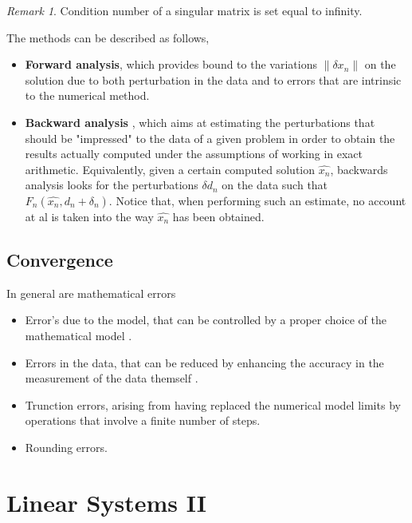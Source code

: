 \documentclass{article}
\theoremstyle{remark}
\newtheorem*{remark}{Remark}
\begin{document}
\begin{remark}
  Condition number of a singular matrix is set equal to infinity.
\end{remark}

\begin{definition}
  The methods can be described as follows,  
  \begin{itemize}
    \item \textbf{Forward analysis}, which provides bound to the variations $\|\delta x_{n}\|$ on the solution due to both perturbation in the data and to errors that are intrinsic to the numerical method.
  \item \textbf{Backward analysis} , which aims at estimating the perturbations that should be "impressed" to the data of a given problem in order to obtain the results actually computed under the assumptions of working in exact arithmetic. Equivalently, given a certain computed solution $\hat{x_n}$, backwards analysis looks for the perturbations $\delta d_{n}$ on the data such that $F_{n} \left( \hat{x_n}, d_n + \delta_n \right)$. Notice that, when performing such an
    estimate, no account at al is taken into the way $\hat{x_{n}}$ has been obtained.
  \end{itemize}
\end{definition}
  
\subsection{Convergence}%
\label{sub:convergence}


In general are mathematical errors 
\begin{itemize}
  \item Error's due to the model, that can be controlled by a proper choice of the mathematical model . 
  \item Errors in the data, that can be reduced by enhancing the accuracy in the measurement of the data themself .
  \item Trunction errors, arising from having replaced the numerical model limits by operations that involve a finite number of steps.
  \item Rounding errors.
\end{itemize}

\newpage
\section{Linear Systems II}%
\label{sec:linear_systems_ii}
\end{document}
